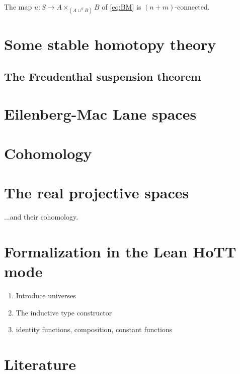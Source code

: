 \documentclass[11pt]{memoir} %
\begin{document}
\begin{thm}
The map $u:S\to A \times_{(A\sqcup^S B)} B$ of \autoref{eq:BM} is $(n+m)$-connected.
\end{thm}

\chapter{Some stable homotopy theory}
\section{The Freudenthal suspension theorem}

\chapter{Eilenberg-Mac Lane spaces}

\chapter{Cohomology}

\chapter{The real projective spaces}
...and their cohomology.

\appendix

\chapter{Formalization in the Lean HoTT mode}
\begin{enumerate}
\item Introduce universes
\item The inductive type constructor
\item identity functions, composition, constant functions
\end{enumerate}

\chapter{Literature}

\backmatter
\end{document}
